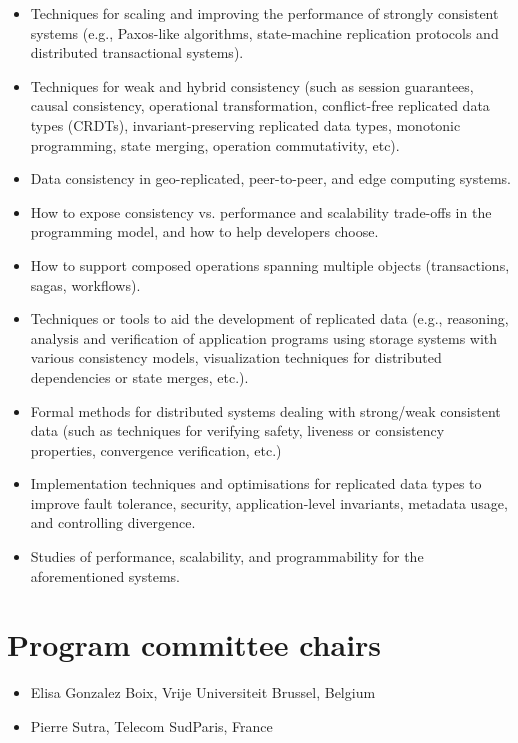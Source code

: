 \documentclass[sigplan,review,anonymous]{acmart}
\begin{document}
\begin{itemize}
\item Techniques for scaling and improving the performance of strongly consistent systems (e.g., Paxos-like algorithms, state-machine replication protocols and distributed transactional systems).
\item Techniques for weak and hybrid consistency (such as session guarantees, causal consistency, operational transformation, conflict-free replicated data types (CRDTs), invariant-preserving replicated data types, monotonic programming, state merging, operation commutativity, etc).
\item Data consistency in geo-replicated, peer-to-peer, and edge computing systems.
\item How to expose consistency vs. performance and scalability trade-offs in the programming model, and how to help developers choose.
\item How to support composed operations spanning multiple objects (transactions, sagas, workflows).
\item Techniques or tools to aid the development of replicated data (e.g., reasoning, analysis and verification of application programs using storage systems with various consistency models, visualization techniques for distributed dependencies or state merges, etc.).
\item Formal methods for distributed systems dealing with strong/weak consistent data (such as techniques for verifying safety, liveness or consistency properties, convergence verification, etc.) 
\item Implementation techniques and optimisations for replicated data types to improve fault tolerance, security, application-level invariants, metadata usage, and controlling divergence.
\item Studies of performance, scalability, and programmability for the aforementioned systems.
\end{itemize}
  
\section*{Program committee chairs}

\begin{itemize}
\item Elisa Gonzalez Boix, Vrije Universiteit Brussel, Belgium
\item Pierre Sutra, Telecom SudParis, France
\end{itemize}
\end{document}
